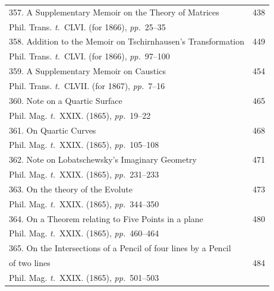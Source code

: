 \documentclass[11pt,a4paper]{article}
\newcommand{\tome}{\textit{t.}}
\newcommand{\pages}{\textit{pp.}}
\begin{document}
\clearpage

\begin{longtable}{p{4.5in}r}
357. A Supplementary Memoir on the Theory of Matrices & 438 \\[-0.3em]
\multicolumn{2}{l}{\quad\small Phil. Trans. \tome~CLVI. (for 1866), \pages~25--35} \\[0.5em]

358. Addition to the Memoir on Tschirnhausen's Transformation & 449 \\[-0.3em]
\multicolumn{2}{l}{\quad\small Phil. Trans. \tome~CLVI. (for 1866), \pages~97--100} \\[0.5em]

359. A Supplementary Memoir on Caustics & 454 \\[-0.3em]
\multicolumn{2}{l}{\quad\small Phil. Trans. \tome~CLVII. (for 1867), \pages~7--16} \\[0.5em]

360. Note on a Quartic Surface & 465 \\[-0.3em]
\multicolumn{2}{l}{\quad\small Phil. Mag. \tome~XXIX. (1865), \pages~19--22} \\[0.5em]

361. On Quartic Curves & 468 \\[-0.3em]
\multicolumn{2}{l}{\quad\small Phil. Mag. \tome~XXIX. (1865), \pages~105--108} \\[0.5em]

362. Note on Lobatschewsky's Imaginary Geometry & 471 \\[-0.3em]
\multicolumn{2}{l}{\quad\small Phil. Mag. \tome~XXIX. (1865), \pages~231--233} \\[0.5em]

363. On the theory of the Evolute & 473 \\[-0.3em]
\multicolumn{2}{l}{\quad\small Phil. Mag. \tome~XXIX. (1865), \pages~344--350} \\[0.5em]

364. On a Theorem relating to Five Points in a plane & 480 \\[-0.3em]
\multicolumn{2}{l}{\quad\small Phil. Mag. \tome~XXIX. (1865), \pages~460--464} \\[0.5em]

\multicolumn{2}{l}{365. On the Intersections of a Pencil of four lines by a Pencil} \\[-0.3em]
\quad of two lines & 484 \\[-0.3em]
\multicolumn{2}{l}{\quad\small Phil. Mag. \tome~XXIX. (1865), \pages~501--503} \\[0.5em]


\end{longtable}
\end{document}

